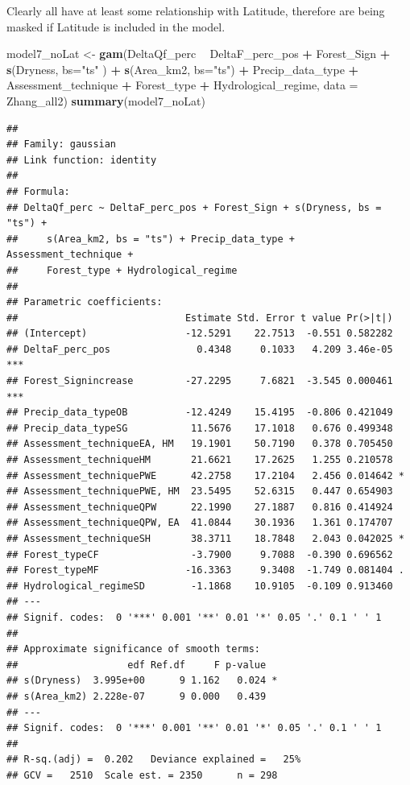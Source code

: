 \documentclass[]{elsarticle} %
\newenvironment{Shaded}{\begin{snugshade}}{\end{snugshade}}
\newcommand{\DataTypeTok}[1]{\textcolor[rgb]{0.13,0.29,0.53}{#1}}
\newcommand{\KeywordTok}[1]{\textcolor[rgb]{0.13,0.29,0.53}{\textbf{#1}}}
\newcommand{\NormalTok}[1]{#1}
\newcommand{\OperatorTok}[1]{\textcolor[rgb]{0.81,0.36,0.00}{\textbf{#1}}}
\newcommand{\StringTok}[1]{\textcolor[rgb]{0.31,0.60,0.02}{#1}}
\begin{document}
Clearly all have at least some relationship with Latitude, therefore are
being masked if Latitude is included in the model.

\begin{Shaded}
\begin{Highlighting}[]
\NormalTok{model7_noLat <-}\StringTok{ }\KeywordTok{gam}\NormalTok{(DeltaQf_perc }\OperatorTok{~}\StringTok{ }\NormalTok{DeltaF_perc_pos }\OperatorTok{+}\StringTok{ }\NormalTok{Forest_Sign }\OperatorTok{+}\StringTok{ }
\StringTok{                    }\KeywordTok{s}\NormalTok{(Dryness, }\DataTypeTok{bs=}\StringTok{"ts"}\NormalTok{ ) }\OperatorTok{+}\StringTok{ }
\StringTok{                      }\KeywordTok{s}\NormalTok{(Area_km2, }\DataTypeTok{bs=}\StringTok{"ts"}\NormalTok{)  }\OperatorTok{+}
\StringTok{                    }\NormalTok{Precip_data_type }\OperatorTok{+}\StringTok{  }\NormalTok{Assessment_technique }\OperatorTok{+}\StringTok{ }\NormalTok{Forest_type }\OperatorTok{+}
\StringTok{                    }\NormalTok{Hydrological_regime, }\DataTypeTok{data =}\NormalTok{ Zhang_all2)}
\KeywordTok{summary}\NormalTok{(model7_noLat)}
\end{Highlighting}
\end{Shaded}

\begin{verbatim}
## 
## Family: gaussian 
## Link function: identity 
## 
## Formula:
## DeltaQf_perc ~ DeltaF_perc_pos + Forest_Sign + s(Dryness, bs = "ts") + 
##     s(Area_km2, bs = "ts") + Precip_data_type + Assessment_technique + 
##     Forest_type + Hydrological_regime
## 
## Parametric coefficients:
##                             Estimate Std. Error t value Pr(>|t|)    
## (Intercept)                 -12.5291    22.7513  -0.551 0.582282    
## DeltaF_perc_pos               0.4348     0.1033   4.209 3.46e-05 ***
## Forest_Signincrease         -27.2295     7.6821  -3.545 0.000461 ***
## Precip_data_typeOB          -12.4249    15.4195  -0.806 0.421049    
## Precip_data_typeSG           11.5676    17.1018   0.676 0.499348    
## Assessment_techniqueEA, HM   19.1901    50.7190   0.378 0.705450    
## Assessment_techniqueHM       21.6621    17.2625   1.255 0.210578    
## Assessment_techniquePWE      42.2758    17.2104   2.456 0.014642 *  
## Assessment_techniquePWE, HM  23.5495    52.6315   0.447 0.654903    
## Assessment_techniqueQPW      22.1990    27.1887   0.816 0.414924    
## Assessment_techniqueQPW, EA  41.0844    30.1936   1.361 0.174707    
## Assessment_techniqueSH       38.3711    18.7848   2.043 0.042025 *  
## Forest_typeCF                -3.7900     9.7088  -0.390 0.696562    
## Forest_typeMF               -16.3363     9.3408  -1.749 0.081404 .  
## Hydrological_regimeSD        -1.1868    10.9105  -0.109 0.913460    
## ---
## Signif. codes:  0 '***' 0.001 '**' 0.01 '*' 0.05 '.' 0.1 ' ' 1
## 
## Approximate significance of smooth terms:
##                   edf Ref.df     F p-value  
## s(Dryness)  3.995e+00      9 1.162   0.024 *
## s(Area_km2) 2.228e-07      9 0.000   0.439  
## ---
## Signif. codes:  0 '***' 0.001 '**' 0.01 '*' 0.05 '.' 0.1 ' ' 1
## 
## R-sq.(adj) =  0.202   Deviance explained =   25%
## GCV =   2510  Scale est. = 2350      n = 298
\end{verbatim}
\end{document}
